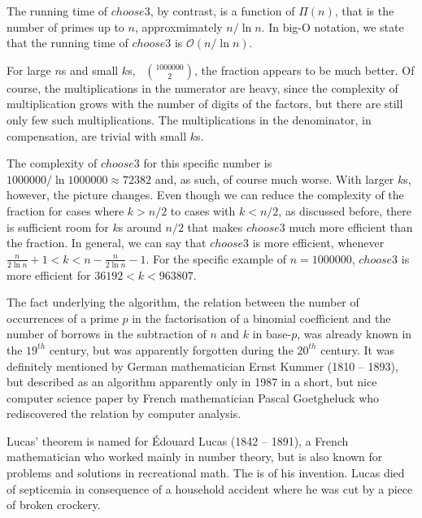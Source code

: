 \documentclass[tikz]{scrreprt}
\newcommand{\Varid}[1]{\mathit{#1}}
\begin{document}
The running time of \ensuremath{\Varid{choose3}}, 
by contrast, is a function
of $\Pi(n)$, that is the number of primes up to $n$,
approxmimately $n/\ln{}n$.
In big-O notation, we state that the running time
of \ensuremath{\Varid{choose3}} is $\mathcal{O}(n/\ln{}n)$.

For large $n$s and small $k$s, 
\eg\ $\binom{1000000}{2}$, the fraction appears to be much better.
Of course, the multiplications in the numerator are heavy,
since the complexity of multiplication grows with the number
of digits of the factors, but there are still only few such multiplications.
The multiplications in the denominator, in compensation, 
are trivial with small $k$s.

The complexity of \ensuremath{\Varid{choose3}} for this specific number
is $1000000/\ln{}1000000 \approx 72382$
and, as such, of course much worse.
With larger $k$s, however, the picture changes.
Even though we can reduce the complexity of the fraction
for cases where $k > n/2$ to cases with $k < n/2$,
as discussed before,
there is sufficient room for $k$s around $n/2$
that makes \ensuremath{\Varid{choose3}} much more efficient than the fraction.
In general, we can say that \ensuremath{\Varid{choose3}} is more efficient,
whenever $\frac{n}{2\ln{}n} + 1 < k < n - \frac{n}{2\ln{}n} - 1$.
For the specific example of $n=1000000$, 
\ensuremath{\Varid{choose3}} is more efficient for 
$36192 < k < 963807$. 

The fact underlying the algorithm,
the relation between the number of occurrences
of a prime $p$ in the factorisation of a
binomial coefficient and the number of
borrows in the subtraction of $n$ and $k$
in base-$p$, was already known in the $19^{th}$
century, but was apparently forgotten during
the $20^{th}$ century.
It was definitely mentioned by German mathematician
Ernst Kummer (1810 -- 1893), but 
described as an algorithm apparently only
in 1987 in a short, but nice computer science paper
by French mathematician
Pascal Goetgheluck who rediscovered the relation
by computer analysis.

Lucas' theorem is named for Édouard Lucas (1842 -- 1891),
a French mathematician who worked mainly in number theory,
but is also known for problems and solutions in
recreational math. The 
is of his invention.
Lucas died of septicemia in consequence of a household accident
where he was cut by a piece of broken crockery. 
\end{document}
